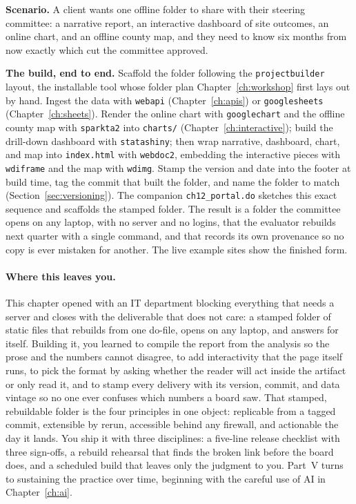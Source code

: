 \documentclass[
    a4paper,
    fontsize=10pt,
    twoside=true,
    numbers=noenddot,
]{kaobook}
\newcounter{appliedexample}
\newenvironment{appliedexample}[1][]{%
    \refstepcounter{appliedexample}%
    \begin{appliedexamplebox}[frametitle={Applied Example~\theappliedexample.~~#1}]%
}{%
    \end{appliedexamplebox}%
}
\begin{document}
\begin{appliedexample}[One evaluation, one folder]\label{ae:ch12-onefolder}
\textbf{Scenario.} A client wants one offline folder to share with their steering committee: a narrative report, an interactive dashboard of site outcomes, an online chart, and an offline county map, and they need to know six months from now exactly which cut the committee approved.

\medskip
\textbf{The build, end to end.} Scaffold the folder following the \texttt{projectbuilder} layout, the installable tool whose folder plan Chapter~\ref{ch:workshop} first lays out by hand. Ingest the data with \texttt{webapi} (Chapter~\ref{ch:apis}) or \texttt{googlesheets} (Chapter~\ref{ch:sheets}). Render the online chart with \texttt{googlechart} and the offline county map with \texttt{sparkta2} into \texttt{charts/} (Chapter~\ref{ch:interactive}); build the drill-down dashboard with \texttt{statashiny}; then wrap narrative, dashboard, chart, and map into \texttt{index.html} with \texttt{webdoc2}, embedding the interactive pieces with \texttt{wdiframe} and the map with \texttt{wdimg}. Stamp the version and date into the footer at build time, tag the commit that built the folder, and name the folder to match (Section~\ref{sec:versioning}). The companion \texttt{ch12\_portal.do} sketches this exact sequence and scaffolds the stamped folder. The result is a folder the committee opens on any laptop, with no server and no logins, that the evaluator rebuilds next quarter with a single command, and that records its own provenance so no copy is ever mistaken for another. The live example sites show the finished form.
\end{appliedexample}

\paragraph{Where this leaves you.} This chapter opened with an IT department blocking everything that needs a server and closes with the deliverable that does not care: a stamped folder of static files that rebuilds from one do-file, opens on any laptop, and answers for itself. Building it, you learned to compile the report from the analysis so the prose and the numbers cannot disagree, to add interactivity that the page itself runs, to pick the format by asking whether the reader will act inside the artifact or only read it, and to stamp every delivery with its version, commit, and data vintage so no one ever confuses which numbers a board saw. That stamped, rebuildable folder is the four principles in one object: replicable from a tagged commit, extensible by rerun, accessible behind any firewall, and actionable the day it lands. You ship it with three disciplines: a five-line release checklist with three sign-offs, a rebuild rehearsal that finds the broken link before the board does, and a scheduled build that leaves only the judgment to you. Part~V turns to sustaining the practice over time, beginning with the careful use of AI in Chapter~\ref{ch:ai}.
\end{document}
